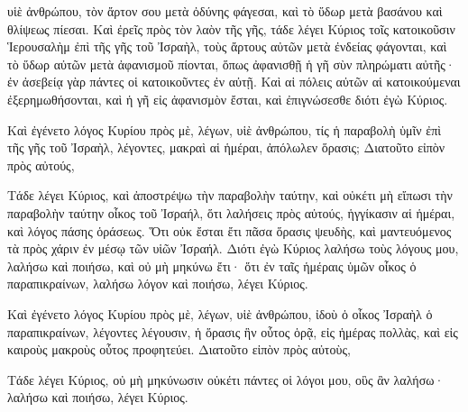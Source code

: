{υἱὲ ἀνθρώπου, τὸν ἄρτον σου μετὰ ὀδύνης φάγεσαι, καὶ τὸ ὕδωρ μετὰ βασάνου καὶ θλίψεως πίεσαι.
Καὶ ἐρεῖς πρὸς τὸν λαὸν τῆς γῆς, τάδε λέγει Κύριος τοῖς κατοικοῦσιν Ἱερουσαλὴμ ἐπὶ τῆς γῆς τοῦ Ἰσραὴλ, τοὺς ἄρτους αὐτῶν μετὰ ἐνδείας φάγονται, καὶ τὸ ὕδωρ αὐτῶν μετὰ ἀφανισμοῦ πίονται, ὅπως ἀφανισθῇ ἡ γῆ σὺν πληρώματι αὐτῆς· ἐν ἀσεβείᾳ γὰρ πάντες οἱ κατοικοῦντες ἐν αὐτῇ.
Καὶ αἱ πόλεις αὐτῶν αἱ κατοικούμεναι ἐξερημωθήσονται, καὶ ἡ γῆ εἰς ἀφανισμὸν ἔσται, καὶ ἐπιγνώσεσθε διότι ἐγὼ Κύριος.
\par }{\PP {}Καὶ ἐγένετο λόγος Κυρίου πρὸς μὲ, λέγων,
υἱὲ ἀνθρώπου, τίς ἡ παραβολὴ ὑμῖν ἐπὶ τῆς γῆς τοῦ Ἰσραὴλ, λέγοντες, μακραὶ αἱ ἡμέραι, ἀπόλωλεν ὅρασις;
Διατοῦτο εἰπὸν πρὸς αὐτούς,
\par }{\PP Τάδε λέγει Κύριος, καὶ ἀποστρέψω τὴν παραβολὴν ταύτην, καὶ οὐκέτι μὴ εἴπωσι τὴν παραβολὴν ταύτην οἶκος τοῦ Ἰσραήλ, ὅτι λαλήσεις πρὸς αὐτούς, ἡγγίκασιν αἱ ἡμέραι, καὶ λόγος πάσης ὁράσεως.
Ὅτι οὐκ ἔσται ἔτι πᾶσα ὅρασις ψευδὴς, καὶ μαντευόμενος τὰ πρὸς χάριν ἐν μέσῳ τῶν υἱῶν Ἰσραήλ.
Διότι ἐγὼ Κύριος λαλήσω τοὺς λόγους μου, λαλήσω καὶ ποιήσω, καὶ οὐ μὴ μηκύνω ἔτι· ὅτι ἐν ταῖς ἡμέραις ὑμῶν οἶκος ὁ παραπικραίνων, λαλήσω λόγον καὶ ποιήσω, λέγει Κύριος.
\par }{\PP {}Καὶ ἐγένετο λόγος Κυρίου πρὸς μὲ, λέγων,
υἱὲ ἀνθρώπου, ἰδοὺ ὁ οἶκος Ἰσραὴλ ὁ παραπικραίνων, λέγοντες λέγουσιν, ἡ ὅρασις ἣν οὗτος ὁρᾷ, εἰς ἡμέρας πολλὰς, καὶ εἰς καιροὺς μακροὺς οὗτος προφητεύει.
Διατοῦτο εἰπὸν πρὸς αὐτοὺς,
\par }{\PP Τάδε λέγει Κύριος, οὐ μὴ μηκύνωσιν οὐκέτι πάντες οἱ λόγοι μου, οὓς ἂν λαλήσω· λαλήσω καὶ ποιήσω, λέγει Κύριος.

}
